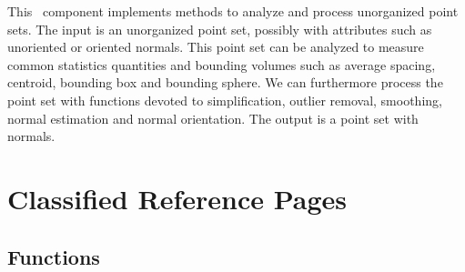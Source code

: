 


This \cgal\ component implements methods to analyze and process unorganized point sets.
The input is an unorganized point set, possibly with attributes such as unoriented or oriented normals.
This point set can be analyzed to measure common statistics quantities and bounding volumes such as average spacing, centroid, bounding box and bounding sphere.
We can furthermore process the point set with functions devoted to simplification, outlier removal, smoothing, normal estimation and normal orientation.
The output is a point set with normals.


\section{Classified Reference Pages}


\subsection{Functions}

  \\
  \\
  \\
  \\
  \\
  \\
  \\
  \\
  \\
  \\
  \\
  \\

